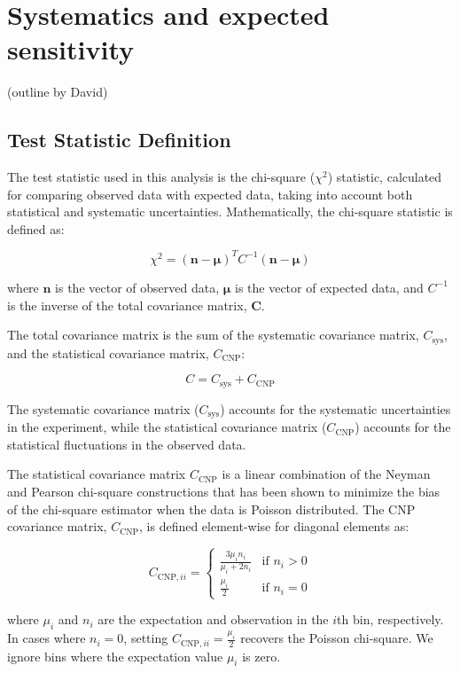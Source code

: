 \section{Systematics and expected sensitivity}
(outline by David)

\subsection{Test Statistic Definition}
The test statistic used in this analysis is the chi-square (\(\chi^2\)) statistic, calculated for comparing observed data with expected data, taking into account both statistical and systematic uncertainties. Mathematically, the chi-square statistic is defined as:

$$
\chi^2 = (\mathbf{n} - \boldsymbol{\mu})^T C^{-1} (\mathbf{n} - \boldsymbol{\mu})
$$

where \(\mathbf{n}\) is the vector of observed data, \(\boldsymbol{\mu}\) is the vector of expected data, and \(C^{-1}\) is the inverse of the total covariance matrix, \(\mathbf{C}\). 

The total covariance matrix is the sum of the systematic covariance matrix, \(C_{\text{sys}}\), and the statistical covariance matrix, \(C_{\text{CNP}}\):

\[
C = C_{\text{sys}} + C_{\text{CNP}}
\]

The systematic covariance matrix (\(C_{\text{sys}}\)) accounts for the systematic uncertainties in the experiment, while the statistical covariance matrix (\(C_{\text{CNP}}\)) accounts for the statistical fluctuations in the observed data.

The statistical covariance matrix \(C_{\text{CNP}}\) is a linear combination of the Neyman and Pearson chi-square constructions that has been shown to minimize the bias of the chi-square estimator when the data is Poisson distributed. The CNP covariance matrix, \(C_{\text{CNP}}\), is defined element-wise for diagonal elements as:

\[
C_{\text{CNP}, ii} = \begin{cases} 
\frac{3 \mu_i n_i}{\mu_i + 2 n_i} & \text{if } n_i > 0 \\
\frac{\mu_i}{2} & \text{if } n_i = 0
\end{cases}
\]

where \(\mu_i\) and \(n_i\) are the expectation and observation in the \(i\)th bin, respectively. In cases where \(n_i = 0\), setting \(C_{\text{CNP}, ii} = \frac{\mu_i}{2}\) recovers the Poisson chi-square. We ignore bins where the expectation value $\mu_i$ is zero. 

